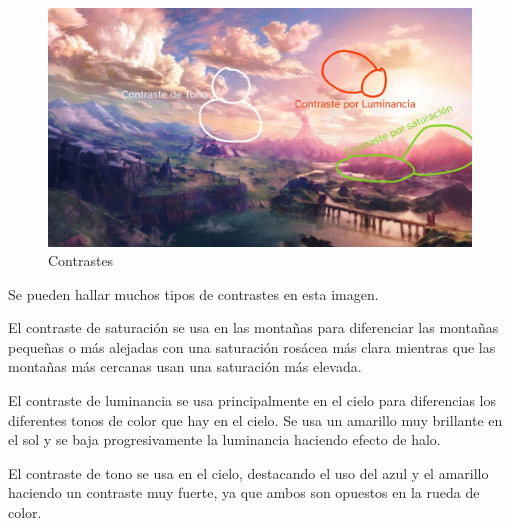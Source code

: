 \documentclass[12pt]{article}
\begin{document}
          \newpage

          \begin{figure}[H]
            \centering
            \includegraphics[width=\textwidth]{Jesus/Seccion2/contrastes.jpg}
            \caption{Contrastes}
          \end{figure}

          Se pueden hallar muchos tipos de contrastes en esta imagen. 

          El contraste de saturación se usa en las montañas para diferenciar las montañas pequeñas o más alejadas con una saturación rosácea más clara mientras que las montañas más cercanas usan una saturación más elevada. 

          El contraste de luminancia se usa principalmente en el cielo para diferencias los diferentes tonos de color que hay en el cielo. Se usa un amarillo muy brillante en el sol y se baja progresivamente la luminancia haciendo efecto de halo. 

          El contraste de tono se usa en el cielo, destacando el uso del azul y el amarillo haciendo un contraste muy fuerte, ya que ambos son opuestos en la rueda de color. 

          \newpage

\end{document}
